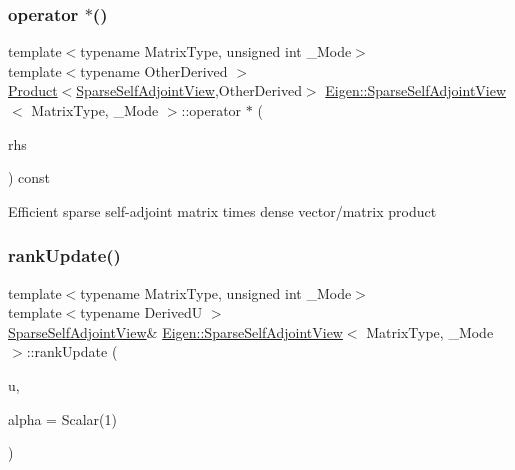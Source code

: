 \subsubsection{\texorpdfstring{operator $\ast$()}{operator *()}\hspace{0.1cm}{\footnotesize\ttfamily [2/2]}}
{\footnotesize\ttfamily template$<$typename Matrix\+Type, unsigned int \+\_\+\+Mode$>$ \\
template$<$typename Other\+Derived $>$ \\
\mbox{\hyperlink{class_eigen_1_1_product}{Product}}$<$\mbox{\hyperlink{class_eigen_1_1_sparse_self_adjoint_view}{Sparse\+Self\+Adjoint\+View}},Other\+Derived$>$ \mbox{\hyperlink{class_eigen_1_1_sparse_self_adjoint_view}{Eigen\+::\+Sparse\+Self\+Adjoint\+View}}$<$ Matrix\+Type, \+\_\+\+Mode $>$\+::operator $\ast$ (\begin{DoxyParamCaption}\item[{const \mbox{\hyperlink{class_eigen_1_1_matrix_base}{Matrix\+Base}}$<$ Other\+Derived $>$ \&}]{rhs }\end{DoxyParamCaption}) const\hspace{0.3cm}{\ttfamily [inline]}}

Efficient sparse self-\/adjoint matrix times dense vector/matrix product \mbox{\label{class_eigen_1_1_sparse_self_adjoint_view_abe66734215f8d8220be0985d67901021}} 
\subsubsection{\texorpdfstring{rankUpdate()}{rankUpdate()}}
{\footnotesize\ttfamily template$<$typename Matrix\+Type, unsigned int \+\_\+\+Mode$>$ \\
template$<$typename DerivedU $>$ \\
\mbox{\hyperlink{class_eigen_1_1_sparse_self_adjoint_view}{Sparse\+Self\+Adjoint\+View}}\& \mbox{\hyperlink{class_eigen_1_1_sparse_self_adjoint_view}{Eigen\+::\+Sparse\+Self\+Adjoint\+View}}$<$ Matrix\+Type, \+\_\+\+Mode $>$\+::rank\+Update (\begin{DoxyParamCaption}\item[{const \mbox{\hyperlink{class_eigen_1_1_sparse_matrix_base}{Sparse\+Matrix\+Base}}$<$ DerivedU $>$ \&}]{u,  }\item[{const Scalar \&}]{alpha = {\ttfamily Scalar(1)} }\end{DoxyParamCaption})}

